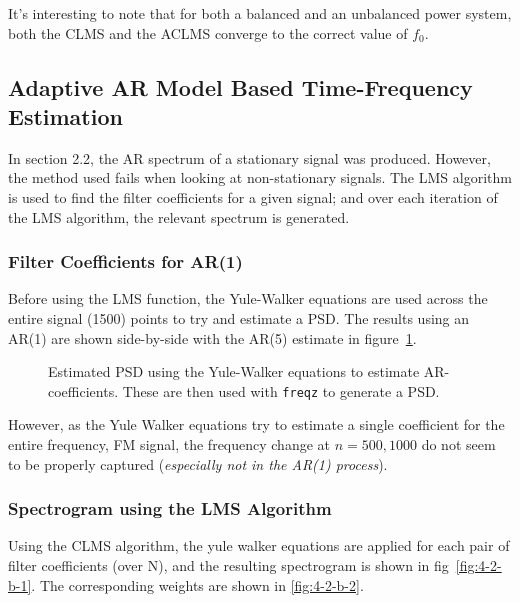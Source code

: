 \documentclass[main.tex]{subfiles}
\begin{document}
It's interesting to note that for both a balanced and an unbalanced power system, both the CLMS and the ACLMS converge to the correct value of $f_0$.


\subsection{Adaptive AR Model Based Time-Frequency Estimation}

In section 2.2, the AR spectrum of a stationary signal was produced. However, the method used fails when looking at non-stationary signals. The LMS algorithm is used to find the filter coefficients for a given signal; and over each iteration of the LMS algorithm, the relevant spectrum is generated. 

\subsubsection{Filter Coefficients for AR(1)}


Before using the LMS function, the Yule-Walker equations are used across the entire signal (1500) points to try and estimate a PSD. The results using an AR(1) are shown side-by-side with the AR(5) estimate in figure~\ref{fig:q4_2_a}.

\begin{figure}[H]
	\centering 
	\resizebox{0.9\textwidth}{!}{}
	\caption{Estimated PSD using the Yule-Walker equations to estimate AR-coefficients. These are then used with {\tt freqz} to generate a PSD.}
	\label{fig:q4_2_a}
\end{figure}

However, as the Yule Walker equations try to estimate a single coefficient for the entire frequency, FM signal, the frequency change at $n=500, 1000$ do not seem to be properly captured (\textit{especially not in the AR(1) process}).


\subsubsection{Spectrogram using the LMS Algorithm}

Using the CLMS algorithm, the yule walker equations are applied for each pair of filter coefficients (over N), and the resulting spectrogram is shown in fig~\ref{fig:4-2-b-1}. The corresponding weights are shown in \ref{fig:4-2-b-2}. 
\end{document}
